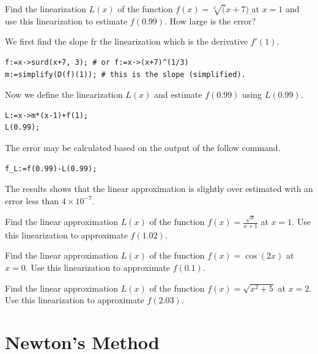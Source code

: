 \documentclass[]{book}
\theoremstyle{definition}
\theoremstyle{definition}
\theoremstyle{definition}
\theoremstyle{remark}
\let\BeginKnitrBlock\begin \let\EndKnitrBlock\end
\begin{document}
\BeginKnitrBlock{example}
\protect\hypertarget{exm:unnamed-chunk-80}{}{\label{exm:unnamed-chunk-80} }
Find the linearization \(L(x)\) of the function \(f(x) = \sqrt[3](x+7)\) at \(x=1\) and use this linearization to estimate \(f(0.99)\). How large is the error?
\EndKnitrBlock{example}

\BeginKnitrBlock{solution}
{}
We first find the slope fr the linearization which is the derivative \(f'(1)\).

\begin{verbatim}
f:=x->surd(x+7, 3); # or f:=x->(x+7)^(1/3)
m:=simplify(D(f)(1)); # this is the slope (simplified).
\end{verbatim}

Now we define the linearization \(L(x)\) and estimate \(f(0.99)\) using \(L(0.99)\).

\begin{verbatim}
L:=x->m*(x-1)+f(1);
L(0.99);
\end{verbatim}

The error may be calculated based on the output of the follow command.

\begin{verbatim}
f_L:=f(0.99)-L(0.99);
\end{verbatim}

The results shows that the linear approximation is slightly over estimated with an error less than \(4\times 10^{-7}\).
\EndKnitrBlock{solution}

\BeginKnitrBlock{exercise}
\protect\hypertarget{exr:unnamed-chunk-82}{}{\label{exr:unnamed-chunk-82} }
Find the linear approximation \(L(x)\) of the function \(f(x) = \frac{\sqrt{x}}{x+1}\) at \(x = 1\). Use this linearization to approximate \(f(1.02)\).
\EndKnitrBlock{exercise}

\BeginKnitrBlock{exercise}
\protect\hypertarget{exr:unnamed-chunk-83}{}{\label{exr:unnamed-chunk-83} }
Find the linear approximation \(L(x)\) of the function \(f(x) = \cos(2x)\) at \(x = 0\). Use this linearization to approximate \(f(0.1)\).
\EndKnitrBlock{exercise}

\BeginKnitrBlock{exercise}
\protect\hypertarget{exr:unnamed-chunk-84}{}{\label{exr:unnamed-chunk-84} }
Find the linear approximation \(L(x)\) of the function \(f(x) = \sqrt{x^2+5}\) at \(x = 2\). Use this linearization to approximate \(f(2.03)\).
\EndKnitrBlock{exercise}

\hypertarget{newtons-method}{%
\section{Newton's Method}\label{newtons-method}}
\end{document}
